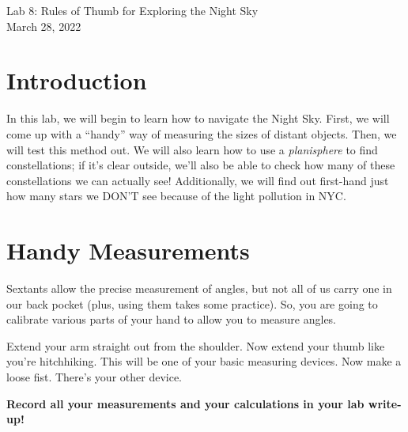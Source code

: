 \documentclass[11pt]{article}
\begin{document}
\begin{center}
\huge{Lab 8: Rules of Thumb for Exploring the Night Sky}\\ \medskip \Large{March 28, 2022}
\end{center}

\section{Introduction}

In this lab, we will begin to learn how to navigate the Night Sky.  First, we will come up with a ``handy'' way of measuring the sizes of distant objects. Then, we will test this method out. We will also learn how to use a \textit{planisphere} to find constellations; if it's clear outside, we'll also be able to check how many of these constellations we can actually see!  Additionally, we will find out first-hand just how many stars we DON'T see because of the light pollution in NYC.

\section{Handy Measurements}

Sextants allow the precise measurement of angles, but not all of us carry one in our back pocket (plus, using them takes some practice). So, you are going to calibrate various parts of your hand to allow you to measure angles.

\medskip \noindent
Extend your arm straight out from the shoulder. Now extend your thumb like you're hitchhiking. This will be one of your basic measuring devices. Now make a loose fist. There's your other device.

\medskip \noindent
\textbf{Record all your measurements and your calculations in your lab write-up!}
\end{document}
